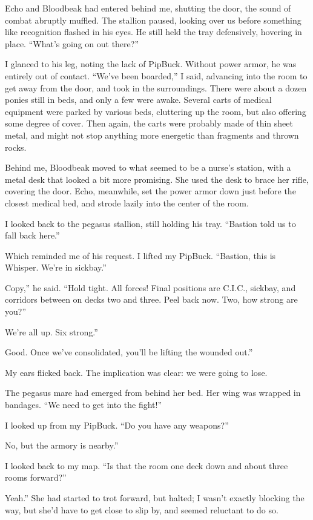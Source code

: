 Echo and Bloodbeak had entered behind me, shutting the door, the sound of combat abruptly muffled. The stallion paused, looking over us before something like recognition flashed in his eyes. He still held the tray defensively, hovering in place. “What’s going on out there?”

I glanced to his leg, noting the lack of PipBuck. Without power armor, he was entirely out of contact. “We’ve been boarded,” I said, advancing into the room to get away from the door, and took in the surroundings. There were about a dozen ponies still in beds, and only a few were awake. Several carts of medical equipment were parked by various beds, cluttering up the room, but also offering some degree of cover. Then again, the carts were probably made of thin sheet metal, and might not stop anything more energetic than fragments and thrown rocks.

Behind me, Bloodbeak moved to what seemed to be a nurse’s station, with a metal desk that looked a bit more promising. She used the desk to brace her rifle, covering the door. Echo, meanwhile, set the power armor down just before the closest medical bed, and strode lazily into the center of the room.

I looked back to the pegasus stallion, still holding his tray. “Bastion told us to fall back here.”

Which reminded me of his request. I lifted my PipBuck. “Bastion, this is Whisper. We’re in sickbay.”

\leavevmode{}Copy,” he said. “Hold tight. All forces! Final positions are C.I.C., sickbay, and corridors between on decks two and three. Peel back now. Two, how strong are you?”

\leavevmode{}We’re all up. Six strong.”

\leavevmode{}Good. Once we’ve consolidated, you’ll be lifting the wounded out.”

My ears flicked back. The implication was clear: we were going to lose.

The pegasus mare had emerged from behind her bed. Her wing was wrapped in bandages. “We need to get into the fight!”

I looked up from my PipBuck. “Do you have any weapons?”

\leavevmode{}No, but the armory is nearby.”

I looked back to my map. “Is that the room one deck down and about three rooms forward?”

\leavevmode{}Yeah.” She had started to trot forward, but halted; I wasn’t exactly blocking the way, but she’d have to get close to slip by, and seemed reluctant to do so.

